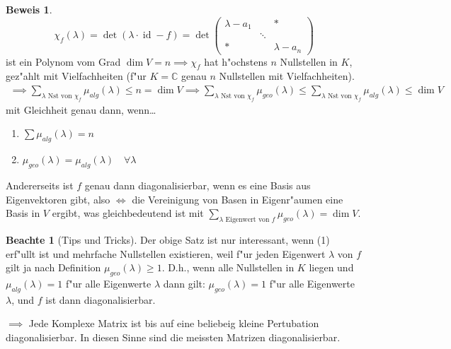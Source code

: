\documentclass[oneside,fontsize=11pt,paper=a4,BCOR=0mm,DIV=12,automark,headsepline]{scrbook}
\DeclareMathOperator{\mId}{id}
\theoremstyle{remark}
\theoremstyle{definition}
\newtheorem*{notte}{Beachte}
\theoremstyle{definition}
\newtheorem*{prof}{Beweis}
\theoremstyle{remark}
\begin{document}
\begin{prof}
  \[\chi_f(\lambda) = \det(\lambda\cdot\mId - f) = \det
    \begin{pmatrix}
      \lambda - a_1 & & * \\
      & \ddots & \\
      * & & \lambda - a_n
    \end{pmatrix}
  \] ist ein Polynom vom Grad $\dim V = n \implies \chi_f$ hat h"ochstens $n$ Nullstellen in $K$, gez"ahlt mit Vielfachheiten (f"ur \(K = \mathbb{C}\) genau \(n\) Nullstellen mit Vielfachheiten).
  \begin{align*}
    \implies \sum_{\lambda \text{ Nst von } \chi_f}\mu_{alg}(\lambda) \leq n = \dim V \implies \sum_{\lambda\text{ Nst von }\chi_f} \mu_{geo}(\lambda) \leq \sum_{\lambda\text{ Nst von }\chi_f}\mu_{alg}(\lambda) \leq \dim V
  \end{align*}
  mit Gleichheit genau dann, wenn\dots
  \begin{enumerate}
  \item \(\sum\mu_{alg}(\lambda) = n\)
  \item \(\mu_{geo}(\lambda) = \mu_{alg}(\lambda) \quad\forall\lambda\)
  \end{enumerate}

  Andererseits ist $f$ genau dann diagonalisierbar, wenn es eine Basis aus
  Eigenvektoren gibt, also \(\iff\) die Vereinigung von Basen in Eigenr"aumen eine Basis in \(V\) ergibt, was gleichbedeutend ist mit \(\sum_{\lambda \text{ Eigenwert von } f}\mu_{geo}(\lambda) = \dim V\).
\end{prof}

\begin{notte}[Tips und Tricks]
    Der obige Satz ist nur interessant, wenn (1) erf"ullt ist und mehrfache
    Nullstellen existieren, weil f"ur jeden Eigenwert $\lambda$ von $f$ gilt ja
    nach Definition $\mu_{geo}(\lambda)\geq 1$. D.h., wenn alle Nullstellen in
    $K$ liegen und \(\mu_{alg}(\lambda) = 1\) f"ur alle Eigenwerte $\lambda$ dann gilt: \(\mu_{geo}(\lambda) = 1\) f"ur alle
    Eigenwerte $\lambda$, und $f$ ist dann diagonalisierbar.

    $\implies$ Jede Komplexe Matrix ist bis auf eine beliebeig kleine
    Pertubation diagonalisierbar. In diesen Sinne sind \glqq{}die meissten\grqq{} Matrizen diagonalisierbar.
\end{notte}
\end{document}
